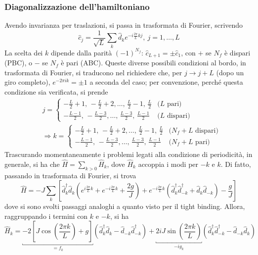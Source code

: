 \documentclass[11pt, a4paper]{scrartcl}
\theoremstyle{style}
\theoremstyle{style1}
\numberwithin{equation}{subsection}
\begin{document}
\subsubsection{Diagonalizzazione dell'hamiltoniano}
Avendo invarianza per traslazioni, si passa in trasformata di Fourier, scrivendo
\[
\hat{c}_j = \frac{1}{\sqrt{L} }\sum_{k}^{} \hat{d}_k e^{- i\frac{2\pi }{L} k j} ,\  j = 1 ,\ldots, L
\] 
La scelta dei $k$ dipende dalla parit\`a $(-1)^{N_f}$: $\hat{c}_{L+1} = \pm \hat{c}_1$, con $+$ se $N_f$ \`e dispari (PBC), o $-$ se $N_f$ \`e pari (ABC).
Queste diverse possibili condizioni al bordo, in trasformata di Fourier, si traducono nel richiedere che, per $j \to j + L$ (dopo un giro completo), $e^{-2 \pi i k} = \pm 1$ a seconda del caso; per convenzione, perch\'e questa condizione sia verificata, si prende
\begin{equation}\label{kval}
\begin{split}
	&j = \begin{cases}
		-\frac{L}{2} +1 ,\, -\frac{L}{2}+2,\ldots,\, \frac{L}{2}-1,\, \frac{L}{2} & \big(L \text{ pari}\big)\\
		-\frac{L-1}{2} ,\, -\frac{L-3}{2},\ldots,\, \frac{L-3}{2},\, \frac{L-1}{2} & \big(L \text{ dispari}\big)
	\end{cases}\\
	&\Rightarrow k = \begin{cases}
		-\frac{L}{2} +1 ,\, -\frac{L}{2}+2,\ldots,\, \frac{L}{2}-1,\, \frac{L}{2} & \big(N_f+L \text{ dispari}\big)\\
		-\frac{L-1}{2} ,\, -\frac{L-3}{2},\ldots,\, \frac{L-3}{2},\, \frac{L-1}{2} & \big(N_f+L \text{ pari}\big)
	\end{cases}
\end{split}
\end{equation}
Trascurando momentaneamente i problemi legati alla condizione di periodicit\`a, in generale, si ha che $\hat{H}=\sum_{k>0}^{}\hat{H}_k$, dove $\hat{H}_k$ accoppia i modi per $-k$ e $k$.
Di fatto, passando in trasformata di Fourier, si trova 
\[
\hat{H} = - J \sum_{k}^{} \left[ \hat{d}^\dagger _k \hat{d}_k \left(e^{i \frac{2\pi}{L}k} + e^{-i \frac{2\pi }{L}k} + \frac{2g}{J}\right) + e^{-i \frac{2\pi}{L}k}\left(\hat{d}^\dagger _k \hat{d}^\dagger _{-k} + \hat{d}_k \hat{d}_{-k} \right) - \frac{g}{J}  \right] 
\] 
dove si sono svolti passaggi analoghi a quanto visto per il tight binding.
Allora, raggruppando i termini con $k$ e $-k$, si ha
\[
	\hat{H}_k = \underbracket{- 2 \left[ J \cos \left( \frac{2\pi k}{L}\right) +g  \right]}_{= f_k}  \left(\hat{d}^\dagger _k \hat{d}_k -\hat{d}_{-k} \hat{d}^\dagger _{-k} \right)+ \underbracket{2i J \sin \left(\frac{2\pi k }{L}\right) }_{-i g_k}  \left(\hat{d}^\dagger _k \hat{d}^\dagger _{-k} - \hat{d}_{-k} \hat{d}_k\right) 
\] 
\end{document}
